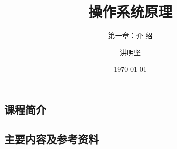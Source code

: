 \documentclass[CJKutf8,xcolor=pdftex,dvipsnames,table]{beamer}
\begin{document}
\begin{CJK*}{UTF8}{song}  

  \title{ 操作系统原理}
  \subtitle{ 第一章：介 绍}
	\author{ 洪明坚}
  \date{\today}


  \frame{\titlepage}


  \section{课程简介}
  \subsection{主要内容及参考资料}


\end{CJK*}
\end{document}
